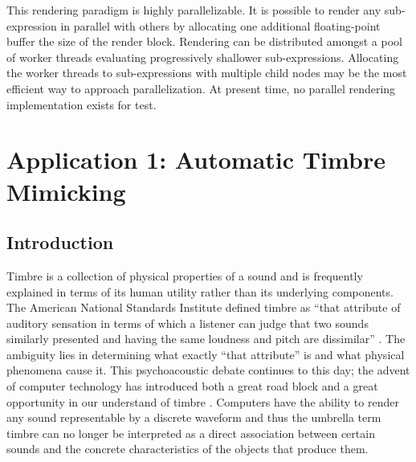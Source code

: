 \documentclass[12pt]{article}
\newcommand{\audiolanguagenamelower}{test}
\begin{document}
This rendering paradigm is highly parallelizable. It is possible to render any sub-expression in parallel with others by allocating one additional floating-point buffer the size of the render block. Rendering can be distributed amongst a pool of worker threads evaluating progressively shallower sub-expressions. Allocating the worker threads to sub-expressions with multiple child nodes may be the most efficient way to approach parallelization. At present time, no parallel rendering implementation exists for \audiolanguagenamelower.

\section{Application 1: Automatic Timbre Mimicking}

\subsection{Introduction}\label{GPINTRO}
Timbre is a collection of physical properties of a sound and is frequently explained in terms of its human utility rather than its underlying components. The American National Standards Institute defined timbre as ``that attribute of auditory sensation in terms of which a listener can judge that two sounds similarly presented and having the same loudness and pitch are dissimilar'' \citep{american1960american}. The ambiguity lies in determining what exactly ``that attribute'' is and what physical phenomena cause it. This psychoacoustic debate continues to this day; the advent of computer technology has introduced both a great road block and a great opportunity in our understand of timbre \citep{erickson1975sound}. Computers have the ability to render any sound representable by a discrete waveform and thus the umbrella term timbre can no longer be interpreted as a direct association between certain sounds and the concrete characteristics of the objects that produce them.
\end{document}
